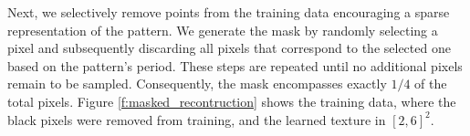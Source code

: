 



Next, we selectively remove points from the training data encouraging a sparse representation of the pattern. We generate the mask by randomly selecting a pixel and subsequently discarding all pixels that correspond to the selected one based on the pattern's period. 
These steps are repeated until no additional pixels remain to be sampled. 
Consequently, the mask encompasses exactly $1/4$ of the total pixels. Figure \ref{f:masked_recontruction} shows the training data, where the black pixels were removed from training, and the learned texture in $[2, 6]^2$. 

